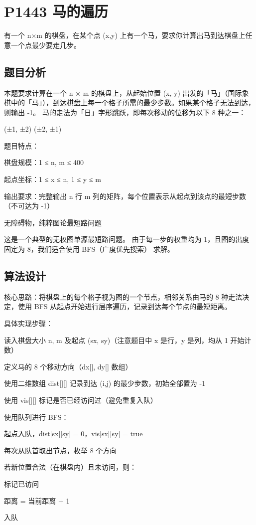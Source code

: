 \documentclass[supercite]{Experimental_Report}
\theoremstyle{definition}
\begin{document}
	\section{P1443 马的遍历}
	有一个 n×m 的棋盘，在某个点 (x,y) 上有一个马，要求你计算出马到达棋盘上任意一个点最少要走几步。
	\subsection{题目分析}
	本题要求计算在一个 n × m 的棋盘上，从起始位置 (x, y) 出发的「马」（国际象棋中的「马」），到达棋盘上每一个格子所需的最少步数。如果某个格子无法到达，则输出 -1。
	马的走法为「日」字形跳跃，即每次移动的位移为以下 8 种之一：
	
	(±1, ±2)
	(±2, ±1)
	
	题目特点：
	
	棋盘规模：1 ≤ n, m ≤ 400
	
	起点坐标：1 ≤ x ≤ n, 1 ≤ y ≤ m
	
	输出要求：完整输出 n 行 m 列的矩阵，每个位置表示从起点到该点的最短步数（不可达为 -1）
	
	无障碍物，纯粹图论最短路问题
	
	这是一个典型的无权图单源最短路问题。
	由于每一步的权重均为 1，且图的出度固定为 8，我们适合使用 BFS（广度优先搜索） 求解。
	\subsection{算法设计}
	核心思路：将棋盘上的每个格子视为图的一个节点，相邻关系由马的 8 种走法决定，使用 BFS 从起点开始进行层序遍历，记录到达每个节点的最短距离。
	
	具体实现步骤：
	
	读入棋盘大小 n, m 及起点 (sx, sy)（注意题目中 x 是行，y 是列，均从 1 开始计数）
	
	定义马的 8 个移动方向（dx[], dy[] 数组）
	
	使用二维数组 dist[][] 记录到达 (i,j) 的最少步数，初始全部置为 -1
	
	使用 vis[][] 标记是否已经访问过（避免重复入队）
	
	使用队列进行 BFS：
	
	起点入队，dist[sx][sy] = 0，vis[sx][sy] = true
	
	每次从队首取出节点，枚举 8 个方向
	
	若新位置合法（在棋盘内）且未访问，则：
	
	标记已访问
	
	距离 = 当前距离 + 1
	
	入队
	
\end{document}
